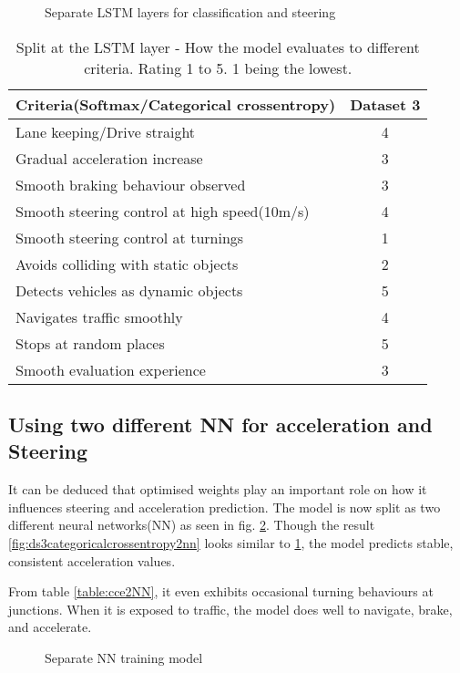 \begin{figure}[!ht]
	\centering
    \def\svgwidth{\textwidth}
    \caption{Separate LSTM layers for classification and steering}
    \label{fig:ds3categoricalcrossentropylstm}
\end{figure}
\begin{table}[!ht]
    \centering
\begin{tabular}{lc}
    \toprule
    Criteria(Softmax/Categorical crossentropy) & Dataset 3 \\\midrule
    Lane keeping/Drive straight  & 4  \\
    Gradual acceleration increase  & 3\\
    Smooth braking behaviour observed & 3 \\
    Smooth steering control at high speed(10m/s) & 4 \\
    Smooth steering control at turnings & 1\\
    Avoids colliding with static objects & 2 \\
    Detects vehicles as dynamic objects & 5 \\
    Navigates traffic smoothly & 4\\
    Stops at random places & 5 \\
    Smooth evaluation experience & 3 \\\bottomrule

\end{tabular}
\caption{Split at the LSTM layer - How the model evaluates to different criteria. Rating 1
to 5. 1 being the lowest.}
\label{table:cceLSTM}
\end{table}

\subsection{Using two different NN for acceleration and
Steering}
It can be deduced that optimised weights play an important role on how it influences
steering and acceleration prediction. The model is now split as two different neural
networks(NN) as seen in fig. \ref{fig:steeringnnsplit}. Though the result
\ref{fig:ds3categoricalcrossentropy2nn} looks similar to
\ref{fig:ds3categoricalcrossentropylstm}, the model predicts stable, consistent
acceleration values.

From table \ref{table:cce2NN}, it even exhibits occasional turning behaviours at junctions. When it
is exposed to traffic, the model does well to navigate, brake, and accelerate.
\begin{figure}[!ht]
	\centering
    \def\svgwidth{0.25\textwidth}
    \caption{Separate NN training model}
    \label{fig:steeringnnsplit}
\end{figure}

